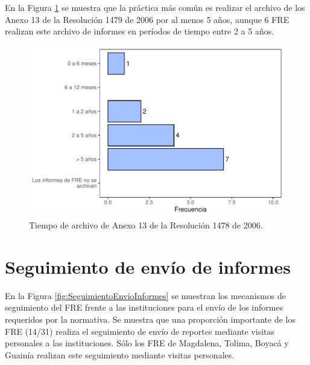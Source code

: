\documentclass[
]{book}
\begin{document}
En la Figura \ref{fig:ArchivoInformesFRE} se muestra que la práctica más común es realizar el archivo de los Anexo 13 de la Resolución 1479 de 2006 por al menos 5 años, aunque 6 FRE realizan este archivo de informes en períodos de tiempo entre 2 a 5 años.

\begin{figure}

{\centering \includegraphics[width=0.85\linewidth]{InformeFinal_files/figure-latex/ArchivoInformesFRE-1} 

}

\caption{Tiempo de archivo de Anexo 13 de la Resolución 1478 de 2006.}\label{fig:ArchivoInformesFRE}
\end{figure}

\hypertarget{seguimiento-de-envuxedo-de-informes}{%
\section{Seguimiento de envío de informes}\label{seguimiento-de-envuxedo-de-informes}}

En la Figura \ref{fig:SeguimientoEnvioInformes} se muestran los mecanismos de seguimiento del FRE frente a las instituciones para el envío de los informes requeridos por la normativa. Se muestra que una proporción importante de los FRE (14/31) realiza el seguimiento de envío de reportes mediante visitas personales a las instituciones. Sólo los FRE de Magdalena, Tolima, Boyacá y Guainía realizan este seguimiento mediante visitas personales.
\end{document}
